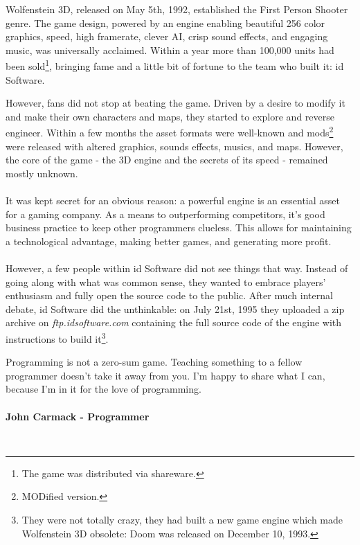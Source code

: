 Wolfenstein 3D, released on May 5th, 1992, established the First Person Shooter genre. The game design, powered by an engine enabling beautiful 256 color graphics, speed, high framerate, clever AI, crisp sound effects, and engaging music, was universally acclaimed. Within a year more than 100,000 units had been sold\footnote{The game was distributed via shareware.}, bringing fame and a little bit of fortune to the team who built it: id Software.\\
\par
\begin{figure}[H]
\centering
{}
\end{figure}
\par
However, fans did not stop at beating the game. Driven by a desire to modify it and make their own characters and maps, they started to explore and reverse engineer. Within a few months the asset formats were well-known and  mods\footnote{MODified version.} were released with altered graphics, sounds effects, musics, and maps. However, the core of the game - the 3D engine and the secrets of its speed - remained mostly unknown.\\
\\
It was kept secret for an obvious reason: a powerful engine is an essential asset for a gaming company. As a means to outperforming competitors, it's good business practice to keep other programmers clueless. This allows for maintaining a technological advantage, making better games, and generating more profit.\\
\\
However, a few people within id Software did not see things that way. Instead of going along with what was common sense, they wanted to embrace players' enthusiasm and fully open the source code to the public. After much internal debate, id Software did the unthinkable: on July 21st, 1995 they uploaded a zip archive on \emph{ftp.idsoftware.com} containing the full source code of the engine with instructions to build it\footnote{They were not totally crazy, they had built a new game engine which made Wolfenstein 3D obsolete: Doom was released on December 10, 1993.}.\\
\par
 \begin{fancyquotes}
   Programming is not a zero-sum game. Teaching something to a fellow programmer doesn't take it away from you. I'm happy to share what I can, because I'm in it for the love of programming.\\
   \\
\textbf{John Carmack - Programmer}
 \end{fancyquotes}\\
